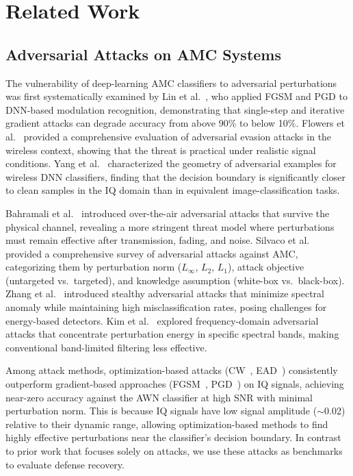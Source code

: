 \chapter{Related Work}
\label{ch:relatedwork}

\section{Adversarial Attacks on AMC Systems}

The vulnerability of deep-learning AMC classifiers to adversarial perturbations
was first systematically examined by Lin et al.~\cite{lin2020tactics}, who
applied FGSM and PGD to DNN-based modulation recognition, demonstrating that
single-step and iterative gradient attacks can degrade accuracy from above
90\% to below 10\%. Flowers et al.~\cite{flowers2019sigguard} provided a
comprehensive evaluation of adversarial evasion attacks in the wireless
context, showing that the threat is practical under realistic signal
conditions. Yang et al.~\cite{yang2018characterizing} characterized the
geometry of adversarial examples for wireless DNN classifiers, finding that
the decision boundary is significantly closer to clean samples in the IQ
domain than in equivalent image-classification tasks.

Bahramali et al.~\cite{bahramali2021robust} introduced over-the-air
adversarial attacks that survive the physical channel, revealing a more
stringent threat model where perturbations must remain effective after
transmission, fading, and noise. Silvaco et al.~\cite{silvaco2023adversarial_rf}
provided a comprehensive survey of adversarial attacks against AMC,
categorizing them by perturbation norm ($L_\infty$, $L_2$, $L_1$), attack
objective (untargeted vs.\ targeted), and knowledge assumption (white-box
vs.\ black-box). Zhang et al.~\cite{zhang2024stealthy} introduced stealthy
adversarial attacks that minimize spectral anomaly while maintaining high
misclassification rates, posing challenges for energy-based detectors. Kim
et al.~\cite{kim2024frequency} explored frequency-domain adversarial attacks
that concentrate perturbation energy in specific spectral bands, making
conventional band-limited filtering less effective.

Among attack methods, optimization-based attacks (CW~\cite{carlini2017towards},
EAD~\cite{chen2020ead}) consistently outperform gradient-based approaches
(FGSM~\cite{goodfellow2015fgsm}, PGD~\cite{madry2018pgd}) on IQ signals,
achieving near-zero accuracy against the AWN classifier at high SNR with
minimal perturbation norm. This is because IQ signals have low signal
amplitude ($\sim$0.02) relative to their dynamic range, allowing
optimization-based methods to find highly effective perturbations near the
classifier's decision boundary. In contrast to prior work that focuses solely
on attacks, we use these attacks as benchmarks to evaluate defense recovery.

